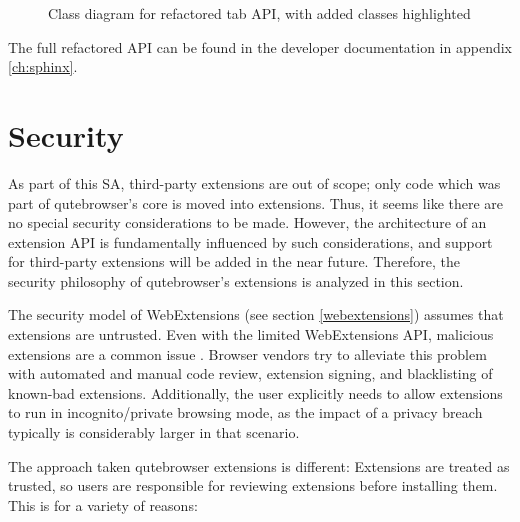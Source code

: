 \documentclass[a4paper,parskip=full]{scrreprt}
\newcommand{\mycomposition}[4]
{
\draw[umlcd style, fill=\umldrawcolor, diamond-] (#1) -- (#4)
node[near end, above]{#2}
node[near end, below]{#3};
}
\begin{document}
\begin{figure}[h]
\caption[Class diagram for refactored tab API]{Class diagram for refactored tab
  API, with added classes highlighted}
\end{figure}

The full refactored API can be found in the developer documentation in appendix
\ref{ch:sphinx}.

\section{Security}
\label{security}
As part of this SA, third-party extensions are out of scope; only code which was
part of qutebrowser's core is moved into extensions. Thus, it seems like there
are no special security considerations to be made. However, the architecture of
an extension API is fundamentally influenced by such considerations, and support
for third-party extensions will be added in the near future. Therefore, the
security philosophy of qutebrowser's extensions is analyzed in this section.

The security model of WebExtensions (see section \ref{webextensions}) assumes
that extensions are untrusted. Even with the limited WebExtensions API,
malicious extensions are a common issue
\autocite{mozilla-signing,mozilla-trustworthy}. Browser vendors try to alleviate
this problem with automated and manual code review, extension signing, and
blacklisting of known-bad extensions. Additionally, the user explicitly needs to
allow extensions to run in incognito/private browsing mode, as the impact of a
privacy breach typically is considerably larger in that scenario.

The approach taken qutebrowser extensions is different: Extensions are treated
as trusted, so users are responsible for reviewing extensions before installing
them. This is for a variety of reasons:
\end{document}
